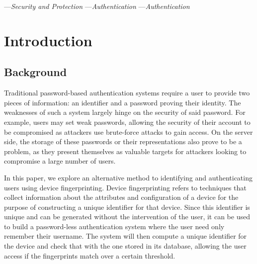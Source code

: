\documentclass{acm_proc_article-sp}
\begin{document}

---\textit{Security and Protection}
---\textit{Authentication}
---\textit{Authentication}



\section{Introduction}
\subsection{Background}
Traditional password-based authentication systems require a user to provide two pieces of information: an identifier and a password proving their identity. The weaknesses of such a system largely hinge on the security of said password. For example, users may set weak passwords, allowing the security of their account to be compromised as attackers use brute-force attacks to gain access. On the server side, the storage of these passwords or their representations also prove to be a problem, as they
present themselves as valuable targets for attackers looking to compromise a large number of users.

In this paper, we explore an alternative method to identifying and authenticating users using device fingerprinting. Device fingerprinting refers to techniques that collect information about the attributes and configuration of a device for the purpose of constructing a unique identifier for that device. Since this identifier is unique and can be generated without the intervention of the user, it can be used to build a password-less authentication system where the user need only remember their
username. The system will then compute a unique identifier for the device and check that with the one stored in its database, allowing the user access if the fingerprints match over a certain threshold.
\end{document}

